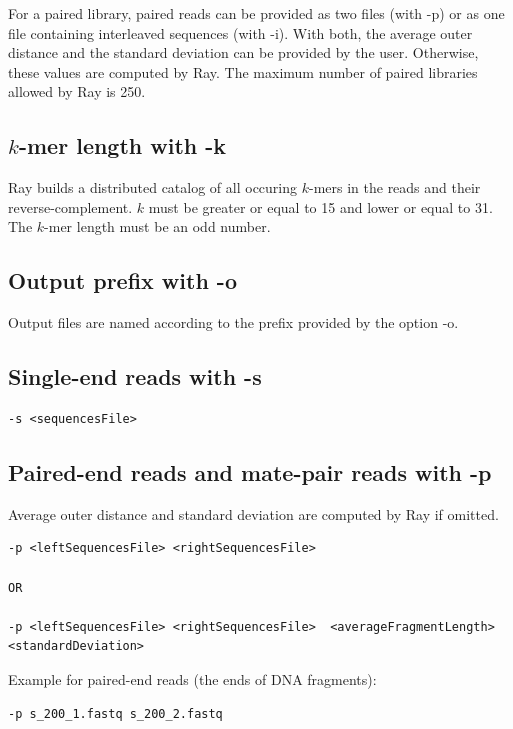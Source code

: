 \documentclass{article}
\begin{document}
For a paired library, paired reads can be provided as two files (with -p) or as one file containing interleaved
sequences (with -i).
With both, the average outer distance and the standard deviation can be provided by the user. Otherwise, these values are
computed by Ray.
The maximum  number of paired libraries allowed by Ray is 250.




\subsection{$k$-mer length with -k}

Ray builds a distributed catalog of all occuring $k$-mers in the reads and their reverse-complement. $k$ must be greater or equal to 15 and lower or equal to 31. The $k$-mer length must be an odd number.

\subsection{Output prefix with -o}

Output files are named according to the prefix provided by the option -o.

\subsection{Single-end reads with -s}

\begin{verbatim}
-s <sequencesFile>
\end{verbatim}

\subsection{Paired-end reads and mate-pair reads with -p}

Average outer distance and standard deviation are computed by Ray if omitted.

\begin{verbatim}
-p <leftSequencesFile> <rightSequencesFile>  

OR

-p <leftSequencesFile> <rightSequencesFile>  <averageFragmentLength> <standardDeviation> 
\end{verbatim}

Example for paired-end reads (the ends of DNA fragments):

\begin{verbatim}
-p s_200_1.fastq s_200_2.fastq
\end{verbatim}
\end{document}
